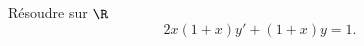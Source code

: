 \begin{enonce}
\begin{exercise}[ID={RMS124 E1300 ICNA PSI},subtitle={2013 ICNA PSI},tags={colle},difficulty={}]
Résoudre sur $\R$
\begin{equation*}
  2x(1+x) y' + (1+x)y = 1.
\end{equation*}
\end{exercise}
\begin{solution}
\end{solution}
\end{enonce}
